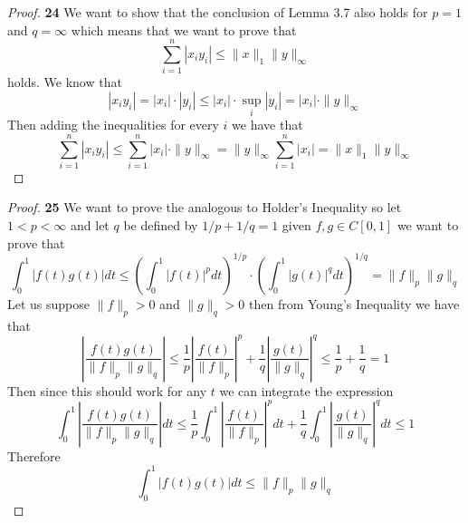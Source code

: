 \documentclass[11pt]{article}
\theoremstyle{definition}
\begin{document}
\cleardoublepage
	\begin{proof}{\textbf{24}}
        We want to show that the conclusion of Lemma 3.7 also holds for $p = 1$ and
        $q = \infty$ which means that we want to prove that
        $$\sum_{i=1}^{n} |x_iy_i| \leq \|x\|_{1}\|y\|_{\infty}$$
        holds. We know that
        $$|x_i y_i| = |x_i| \cdot |y_i| \leq |x_i| \cdot \sup_i |y_i| =
        |x_i|\cdot \|y\|_\infty$$
        Then adding the inequalities for every $i$ we have that
        $$\sum_{i=1}^{n} |x_i y_i| \leq \sum_{i=1}^{n} |x_i|\cdot \|y\|_\infty =
        \|y\|_\infty \sum_{i=1}^{n} |x_i| = \|x\|_1 \|y\|_\infty$$
    \end{proof}
    \begin{proof}{\textbf{25}}
        We want to prove the analogous to Holder's Inequality so let
        $1<p<\infty$ and let $q$ be defined by $1/p + 1/q = 1$ given
        $f,g \in C[0,1]$ we want to prove that
        $$\int_0^1 |f(t)g(t)| dt \leq (\int_0^1 |f(t)|^p dt)^{1/p}
        \cdot(\int_0^1 |g(t)|^q dt)^{1/q} = \|f\|_p \|g\|_q$$
        Let us suppose $\|f\|_p > 0$ and $\|g\|_q > 0$ then from Young's Inequality we
        have that
        $$\left|\frac{f(t)g(t)}{\|f\|_p\|g\|_q}\right| \leq
        \frac{1}{p}\left|\frac{f(t)}{\|f\|_p}\right|^p +
        \frac{1}{q}\left|\frac{g(t)}{\|g\|_q}\right|^q \leq
        \frac{1}{p} + \frac{1}{q} = 1$$
        Then since this should work  for any $t$ we can integrate the expression
        $$\int_0^1 \left|\frac{f(t)g(t)}{\|f\|_p\|g\|_q}\right|dt \leq
        \frac{1}{p} \int_0^1\left|\frac{f(t)}{\|f\|_p}\right|^pdt +
        \frac{1}{q} \int_0^1\left|\frac{g(t)}{\|g\|_q}\right|^qdt \leq 1$$
        Therefore
        $$\int_0^1 |f(t)g(t)|dt \leq \|f\|_p\|g\|_q$$
        

\end{proof}
\end{document}
